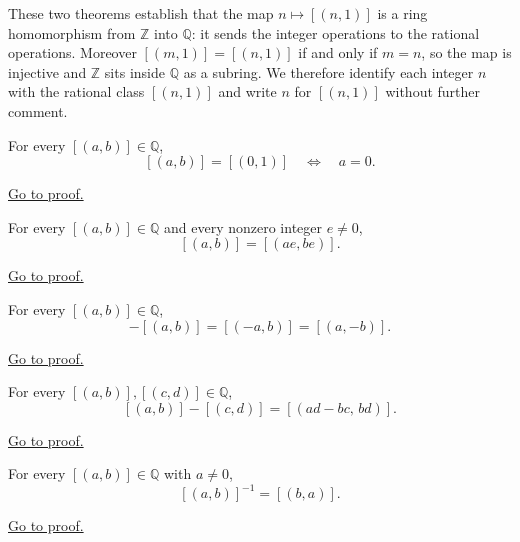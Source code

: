 \begin{remark*}
\label{rem:integer-embedding}
These two theorems establish that the map $n\mapsto[(n,1)]$ is a ring
homomorphism from $\mathbb{Z}$ into $\mathbb{Q}$: it sends the integer
operations to the rational operations.  Moreover $[(m,1)]=[(n,1)]$ if
and only if $m=n$, so the map is injective and $\mathbb{Z}$ sits inside
$\mathbb{Q}$ as a subring.  We therefore identify each integer $n$ with
the rational class $[(n,1)]$ and write $n$ for $[(n,1)]$ without further
comment.
\end{remark*}

\begin{theorem}
\label{thm:ec-zero-numerator}
For every $[(a,b)]\in\mathbb{Q}$,
\[
[(a,b)] = [(0,1)]
\quad\Longleftrightarrow\quad
a = 0.
\]
\end{theorem}

\begin{remark*}[Proof]
\hyperref[prf:ec-zero-numerator]{Go to proof.}
\end{remark*}

\begin{theorem}
\label{thm:ec-scaling}
For every $[(a,b)]\in\mathbb{Q}$ and every nonzero integer $e\neq 0$,
\[
[(a,b)] = [(ae,be)].
\]
\end{theorem}

\begin{remark*}[Proof]
\hyperref[prf:ec-scaling]{Go to proof.}
\end{remark*}

\begin{theorem}
\label{thm:ec-negation}
For every $[(a,b)]\in\mathbb{Q}$,
\[
-[(a,b)] = [(-a,b)] = [(a,-b)].
\]
\end{theorem}

\begin{remark*}[Proof]
\hyperref[prf:ec-negation]{Go to proof.}
\end{remark*}

\begin{theorem}
\label{thm:ec-subtraction}
For every $[(a,b)],[(c,d)]\in\mathbb{Q}$,
\[
[(a,b)] - [(c,d)] = [(ad-bc,\,bd)].
\]
\end{theorem}

\begin{remark*}[Proof]
\hyperref[prf:ec-subtraction]{Go to proof.}
\end{remark*}

\begin{theorem}
\label{thm:ec-reciprocal}
For every $[(a,b)]\in\mathbb{Q}$ with $a\neq 0$,
\[
[(a,b)]^{-1} = [(b,a)].
\]
\end{theorem}

\begin{remark*}[Proof]
\hyperref[prf:ec-reciprocal]{Go to proof.}
\end{remark*}
